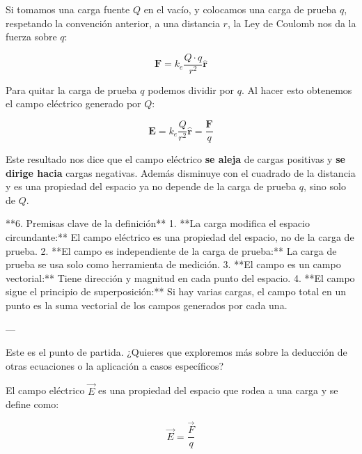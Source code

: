 Si tomamos una carga fuente \( Q \) en el vacío, y colocamos una carga de prueba \( q \), respetando la convención anterior, a una distancia \( r \), la Ley de Coulomb nos da la fuerza sobre \( q \):

\[
\mathbf{F} = k_e \frac{Q \cdot q}{r^2} \hat{\mathbf{r}}
\]

Para quitar la carga de prueba \( q \) podemos dividir por \( q \). Al hacer esto obtenemos el campo eléctrico generado por \( Q \):

\[
\mathbf{E} = k_e \frac{Q}{r^2} \hat{\mathbf{r}} = \frac{\mathbf{F}}{q}
\]

Este resultado nos dice que el campo eléctrico \textbf{se aleja} de cargas positivas y \textbf{se dirige hacia} cargas negativas. Además disminuye con el cuadrado de la distancia y es una propiedad del espacio ya no depende de la carga de prueba \( q \), sino solo de \( Q \).

**6. Premisas clave de la definición**
1. **La carga modifica el espacio circundante:** El campo eléctrico es una propiedad del espacio, no de la carga de prueba.
2. **El campo es independiente de la carga de prueba:** La carga de prueba se usa solo como herramienta de medición.
3. **El campo es un campo vectorial:** Tiene dirección y magnitud en cada punto del espacio.
4. **El campo sigue el principio de superposición:** Si hay varias cargas, el campo total en un punto es la suma vectorial de los campos generados por cada una.

---

Este es el punto de partida. ¿Quieres que exploremos más sobre la deducción de otras ecuaciones o la aplicación a casos específicos?

El campo eléctrico \( \vec{E} \) es una propiedad del espacio que rodea a una carga y se define como:

\begin{equation}
    \vec{E} = \frac{\vec{F}}{q}
\end{equation}
